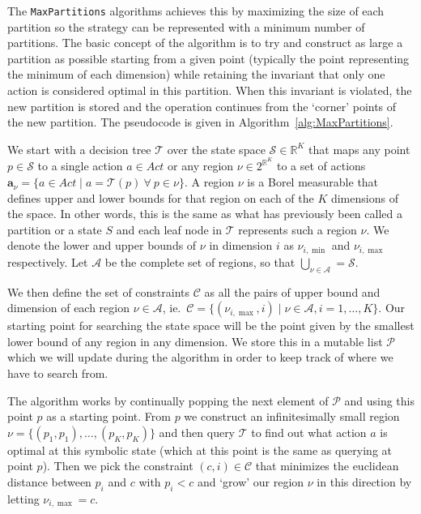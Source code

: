 The \texttt{MaxPartitions} algorithms achieves this by maximizing the size of
each partition so the strategy can be represented with a minimum number of
partitions. The basic concept of the algorithm is to try and construct as large
a partition as possible starting from a given point (typically the point
representing the minimum of each dimension) while retaining the invariant that
only one action is considered optimal in this partition. When this invariant is
violated, the new partition is stored and the operation continues from the
`corner' points of the new partition.  The pseudocode is given in
Algorithm~\ref{alg:MaxPartitions}.

We start with a decision tree $\mathcal{T}$ over the state space $\mathcal{S}
\in \mathbb{R}^K$ that maps any point $p \in \mathcal{S}$ to a single action $a
\in Act$ or any region $\nu \in 2^{\mathbb{R}^K}$ to a set of actions
$\mathbf{a}_{\nu} = \{ a \in Act \mid a = \mathcal{T}(p) \ \forall \ p \in \nu
\}$. A region $\nu$ is a Borel measurable that defines upper and lower bounds
for that region on each of the $K$ dimensions of the space. In other words, this
is the same as what has previously been called a partition or a state $S$ and
each leaf node in $\mathcal{T}$ represents such a region $\nu$. We denote the
lower and upper bounds of $\nu$ in dimension $i$ as $\nu_{i,\min}$ and
$\nu_{i,\max}$ respectively. Let $\mathcal{A}$ be the complete set of regions, so
that $\bigcup_{\nu \in \mathcal{A}} = \mathcal{S}$.

We then define the set of constraints $\mathcal{C}$ as all the pairs of upper
bound and dimension of each region $\nu \in \mathcal{A}$, ie.\ $\mathcal{C} = \{
(\nu_{i,\max}, i) \mid \nu \in \mathcal{A}, i = 1, \ldots, K \}$. Our starting point
for searching the state space will be the point given by the smallest lower
bound of any region in any dimension. We store this in a mutable list
$\mathcal{P}$ which we will update during the algorithm in order to keep track
of where we have to search from.

The algorithm works by continually popping the next element of $\mathcal{P}$ and
using this point $p$ as a starting point. From $p$ we construct an
infinitesimally small region $\nu = \{ (p_1, p_1), \ldots, (p_K,p_K) \}$ and then
query $\mathcal{T}$ to find out what action $a$ is optimal at this symbolic
state (which at this point is the same as querying at point $p$). Then we pick
the constraint $(c,i) \in \mathcal{C}$ that minimizes the euclidean distance
between $p_i$ and $c$ with $p_i < c$ and `grow' our region $\nu$ in this
direction by letting $\nu_{i,\max} = c$.

